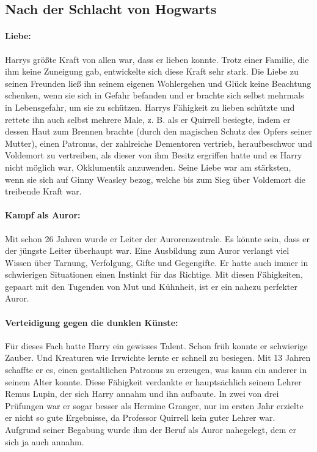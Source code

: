 \documentclass[a4paper, 10pt]{article}
\begin{document}
\subsection*{\Large Nach der Schlacht von Hogwarts}
\vspace{10pt}
\newline
\paragraph{Liebe:} 

Harrys größte Kraft von allen war, dass er lieben konnte. Trotz einer Familie, die ihm keine Zuneigung gab, entwickelte sich diese Kraft sehr stark. Die Liebe zu seinen Freunden ließ ihn seinem eigenen Wohlergehen und Glück keine Beachtung schenken, wenn sie sich in Gefahr befanden und er brachte sich selbst mehrmals in Lebensgefahr, um sie zu schützen. Harrys Fähigkeit zu lieben schützte und rettete ihn auch selbst mehrere Male, z. B. als er Quirrell besiegte, indem er dessen Haut zum Brennen brachte (durch den magischen Schutz des Opfers seiner Mutter), einen Patronus, der zahlreiche Dementoren vertrieb, heraufbeschwor und Voldemort zu vertreiben, als dieser von ihm Besitz ergriffen hatte und es Harry nicht möglich war, Okklumentik anzuwenden. Seine Liebe war am stärksten, wenn sie sich auf Ginny Weasley bezog, welche bis zum Sieg über Voldemort die treibende Kraft war.

\paragraph{Kampf als Auror:}
Mit schon 26 Jahren wurde er Leiter der Aurorenzentrale. Es könnte sein, dass er der jüngste Leiter überhaupt war. Eine Ausbildung zum Auror verlangt viel Wissen über Tarnung, Verfolgung, Gifte und Gegengifte. Er hatte auch immer in schwierigen Situationen einen Instinkt für das Richtige. Mit diesen Fähigkeiten, gepaart mit den Tugenden von Mut und Kühnheit, ist er ein nahezu perfekter Auror.

\paragraph{Verteidigung gegen die dunklen Künste:}
Für dieses Fach hatte Harry ein gewisses Talent. Schon früh konnte er schwierige Zauber. Und Kreaturen wie Irrwichte lernte er schnell zu besiegen. Mit 13 Jahren schaffte er es, einen gestaltlichen Patronus zu erzeugen, was kaum ein anderer in seinem Alter konnte. Diese Fähigkeit verdankte er hauptsächlich seinem Lehrer Remus Lupin, der sich Harry annahm und ihn aufbaute. In zwei von drei Prüfungen war er sogar besser als Hermine Granger, nur im ersten Jahr erzielte er nicht so gute Ergebnisse, da Professor Quirrell kein guter Lehrer war. Aufgrund seiner Begabung wurde ihm der Beruf als Auror nahegelegt, dem er sich ja auch annahm.
\end{document}
